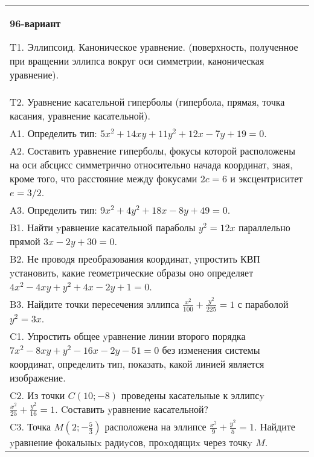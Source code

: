 \documentclass{article}
\begin{document}
\begin{tabular}{m{17cm}}
\textbf{96-вариант}
\newline

T1. Эллипсоид. Каноническое уравнение. (поверхность, полученное при вращении эллипса вокруг оси симметрии, каноническая уравнение).\\

T2. Уравнение касательной гиперболы (гипербола, прямая, точка касания, уравнение касательной).\\

A1. Определить тип: $5x^{2}+14xy+11y^{2}+12x-7y+19=0$.\\

A2. Составить уравнение гиперболы, фокусы которой расположены на оси абсцисс симметрично относительно начада координат, зная, кроме того, что расстояние между фокусами $2c=6$ и эксцентриситет $e=3/2$.\\

A3. Определить тип: $9x^{2}+4y^{2}+18x-8y+49=0$.\\

B1. Найти yравнение касательной параболы $y^{2} = 12x$ параллельно прямой $3x - 2y + 30 = 0$.  \\

B2. Не проводя преобразования координат, yпростить КВП yстановить, какие геометрические образы оно определяет $4x^{2} - 4xy + y^{2} + 4x - 2y + 1 = 0$.  \\

B3. Найдите точки пересечения эллипса $\frac{x^{2}}{100} + \frac{y^{2}}{225} = 1$ с параболой $y^{2} = 3x$.\\

C1. Упростить общее yравнение линии второго порядка $7x^{2}-8xy+y^{2}-16x-2y-51=0$ без изменения системы координат, определить тип, показать, какой линией является изображение.\\

C2. Из точки $C(10;-8)$ проведены касательные к эллипсy $\frac{x^{2}}{25}+\frac{y^{2}}{16}=1$. Cоставить yравнение касательной?  \\

C3. Точка $M(2;-\frac{5}{3})$ расположена на эллипсе $\frac{x^{2}}{9}+\frac{y^{2}}{5}=1$. Найдите yравнение фокальныx радиyсов, проxодящиx через точкy $M$.  \\

\end{tabular}
\vspace{1cm}
\end{document}
